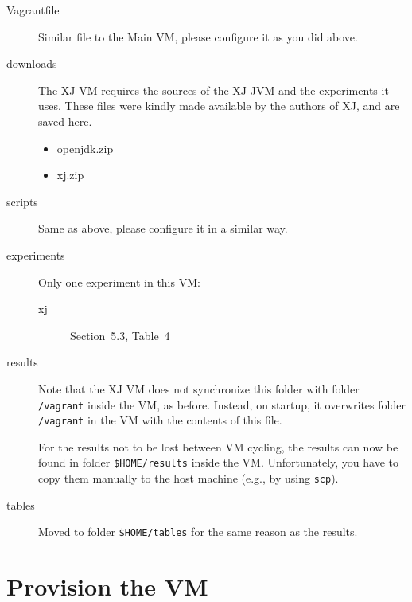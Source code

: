 \documentclass[12pt]{article}
\begin{document}
\begin{description}

    \item[Vagrantfile] Similar file to the Main VM, please configure it as you
        did above.

    \item[downloads] The XJ VM requires the sources of the XJ JVM and the
        experiments it uses.  These files were kindly made available by the
        authors of XJ, and are saved here.

        \begin{itemize}

            \item openjdk.zip

            \item xj.zip

        \end{itemize}

    \item[scripts]  Same as above, please configure it in a similar way.

    \item[experiments]  Only one experiment in this VM:

        \begin{description}

            \item[xj] Section~5.3, Table~4

        \end{description}

    \item[results]  Note that the XJ VM does not synchronize this folder with
        folder \texttt{/vagrant} inside the VM, as before.  Instead, on startup,
        it overwrites folder \texttt{/vagrant} in the VM with the contents of
        this file.

        For the results not to be lost between VM cycling, the results can now
        be found in folder \texttt{\$HOME/results} inside the VM.
        Unfortunately, you have to copy them manually to the host machine (e.g.,
        by using \texttt{scp}).


    \item[tables]  Moved to folder \texttt{\$HOME/tables} for the same reason as
        the results.

\end{description}


\section{Provision the VM}
\end{document}
